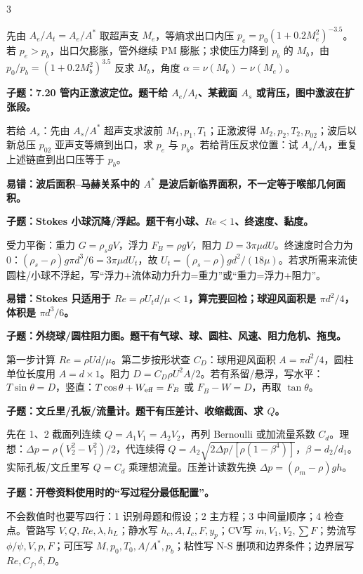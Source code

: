 \documentclass[a4paper]{article}
\newcommand{\qt}[1]{\vspace{0.10pt}\colorbox{Q}{\parbox{\dimexpr\linewidth-2\fboxsep}{\color{white}\bfseries #1}}\par}
\newcommand{\ans}[1]{\colorbox{G}{\parbox{\dimexpr\linewidth-2\fboxsep}{#1}}\par}
\newcommand{\warn}[1]{\colorbox{Y}{\parbox{\dimexpr\linewidth-2\fboxsep}{\color{E}\bfseries #1}}\par}
\begin{document}
\begin{multicols}{3}
\ans{先由 $A_e/A_t=A_e/A^*$ 取超声支 $M_e$，等熵求出口内压 $p_e=p_0(1+0.2M_e^2)^{-3.5}$。若 $p_e>p_b$，出口欠膨胀，管外继续 PM 膨胀；求使压力降到 $p_b$ 的 $M_b$，由 $p_0/p_b=(1+0.2M_b^2)^{3.5}$ 反求 $M_b$，角度 $\alpha=\nu(M_b)-\nu(M_e)$。}
\qt{子题：7.20 管内正激波定位。题干给 $A_e/A_t$、某截面 $A_s$ 或背压，图中激波在扩张段。}
\ans{若给 $A_s$：先由 $A_s/A^*$ 超声支求波前 $M_1,p_1,T_1$；正激波得 $M_2,p_2,T_2,p_{02}$；波后以新总压 $p_{02}$ 亚声支等熵到出口，求 $p_e$ 与 $p_b$。若给背压反求位置：试 $A_s/A_t$，重复上述链直到出口压等于 $p_b$。}
\warn{易错：波后面积--马赫关系中的 $A^*$ 是波后新临界面积，不一定等于喉部几何面积。}
\qt{子题：Stokes 小球沉降/浮起。题干有小球、$Re<1$、终速度、黏度。}
\ans{受力平衡：重力 $G=\rho_s gV$，浮力 $F_B=\rho gV$，阻力 $D=3\pi\mu dU$。终速度时合力为0：$(\rho_s-\rho)g\pi d^3/6=3\pi\mu dU_t$，故 $U_t=(\rho_s-\rho)gd^2/(18\mu)$。若求所需来流使圆柱/小球不浮起，写“浮力+流体动力升力=重力”或“重力=浮力+阻力”。}
\warn{易错：Stokes 只适用于 $Re=\rho U_td/\mu<1$，算完要回检；球迎风面积是 $\pi d^2/4$，体积是 $\pi d^3/6$。}
\qt{子题：外绕球/圆柱阻力图。题干有气球、球、圆柱、风速、阻力危机、拖曳。}
\ans{第一步计算 $Re=\rho Ud/\mu$。第二步按形状查 $C_D$：球用迎风面积 $A=\pi d^2/4$，圆柱单位长度用 $A=d\times1$。阻力 $D=C_D\rho U^2A/2$。若有系留/悬浮，写水平：$T\sin\theta=D$，竖直：$T\cos\theta+W_{\rm eff}=F_B$ 或 $F_B-W=D$，再取 $\tan\theta$。}
\qt{子题：文丘里/孔板/流量计。题干有压差计、收缩截面、求 $Q$。}
\ans{先在 1、2 截面列连续 $Q=A_1V_1=A_2V_2$，再列 Bernoulli 或加流量系数 $C_d$。理想：$\Delta p=\rho(V_2^2-V_1^2)/2$，代连续得 $Q=A_2\sqrt{2\Delta p/[\rho(1-\beta^4)]}$，$\beta=d_2/d_1$。实际孔板/文丘里写 $Q=C_d$ 乘理想流量。压差计读数先换 $\Delta p=(\rho_m-\rho)gh$。}
\qt{子题：开卷资料使用时的“写过程分最低配置”。}
\ans{不会数值时也要写四行：1 识别母题和假设；2 主方程；3 中间量顺序；4 检查点。管路写 $V,Q,Re,\lambda,h_L$；静水写 $h_c,A,I_c,F,y_p$；CV写 $\dot m,V_1,V_2,\sum F$；势流写 $\phi/\psi,V,p,F$；可压写 $M,p_0,T_0,A/A^*,p_b$；粘性写 N-S 删项和边界条件；边界层写 $Re,C_f,\delta,D$。}


\end{multicols}
\end{document}
